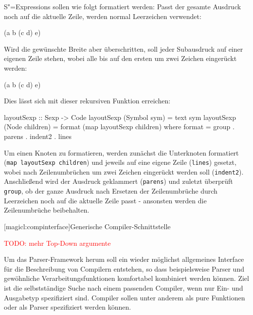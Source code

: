 \documentclass[11pt, a4paper, bibgerm]{scrbook}
\newenvironment{DIFnomarkup}{}{}
\newcommand\icode[1]{\lstinline?#1?}
\newcommand{\todo}[1]{
  \textcolor{red}{TODO: #1}
}
\newcommand\lsection{}
\newcommand{\sexps}{S"=Expressions}
\begin{document}
\sexps{} sollen wie folgt formatiert werden: Passt der gesamte Ausdruck
noch auf die aktuelle Zeile, werden normal Leerzeichen verwendet:
\begin{DIFnomarkup}\begin{code}
(a b (c d) e)
\end{code}\end{DIFnomarkup}
Wird die gewünschte Breite aber überschritten, soll jeder Subausdruck
auf einer eigenen Zeile stehen, wobei alle bis auf den ersten um zwei
Zeichen eingerückt werden:
\begin{DIFnomarkup}\begin{code}
(a
  b
  (c d)
  e)
\end{code}\end{DIFnomarkup}
Dies lässt sich mit dieser rekursiven Funktion erreichen:
\begin{DIFnomarkup}\begin{code}
layoutSexp :: Sexp -> Code
layoutSexp (Symbol sym)    = text sym
layoutSexp (Node children) = format (map layoutSexp children)
  where format = group . parens . indent2 . lines
\end{code}\end{DIFnomarkup} %

Um einen Knoten zu formatieren, werden zunächst die Unterknoten
formatiert \\ (\icode{map layoutSexp children}) und jeweils auf eine eigene
Zeile (\icode{lines}) gesetzt, wobei nach Zeilenumbrüchen um zwei
Zeichen eingerückt werden soll (\icode{indent2}). Anschließend wird
der Ausdruck geklammert (\icode{parens}) und zuletzt überprüft
\icode{group}, ob der ganze Ausdruck nach Ersetzen der Zeilenumbrüche
durch Leerzeichen noch auf die aktuelle Zeile passt - ansonsten werden
die Zeilenumbrüche beibehalten.

\lsection[magicl:compinterface]{Generische Compiler-Schnittstelle}

\todo{mehr Top-Down argumente}

Um das Parser-Framework herum soll ein wieder möglichst allgemeines
Interface für die Beschreibung von Compilern entstehen, so dass
beispielsweise Parser und gewöhnliche Verarbeitungsfunktionen
komfortabel kombiniert werden können. Ziel ist die selbstständige Suche
nach einem passenden Compiler, wenn nur Ein- und Ausgabetyp spezifiziert
sind. Compiler sollen unter anderem als pure Funktionen oder als Parser
spezifiziert werden können.
\end{document}
